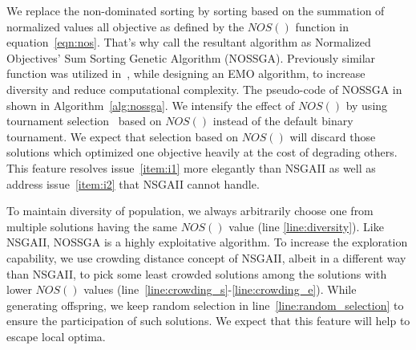 We replace the non-dominated sorting by sorting based on the summation of normalized values all objective as defined by the $NOS()$ function in equation~\ref{eqn:nos}. That's why call the resultant algorithm as Normalized Objectives' Sum Sorting Genetic Algorithm (NOSSGA). Previously similar function was utilized in~\cite{qu2010multi}, while designing an EMO algorithm, to increase diversity and reduce computational complexity. The pseudo-code of NOSSGA in shown in Algorithm~\ref{alg:nossga}. We intensify the effect of $NOS()$ by using tournament selection~\cite{goldberg1991comparative} based on $NOS()$ instead of the default binary tournament. We expect that selection based on $NOS()$ will discard those solutions which optimized one objective heavily at the cost of degrading others. This feature resolves issue~\ref{item:i1} more elegantly than NSGAII as well as address issue~\ref{item:i2} that NSGAII cannot handle. 

To maintain diversity of population, we always arbitrarily choose one from multiple solutions having the same $NOS()$ value (line \ref{line:diversity}). Like NSGAII, NOSSGA is a highly exploitative algorithm. To increase the exploration capability, we use crowding distance concept of NSGAII, albeit in a different way than NSGAII, to pick some least crowded solutions among the solutions with lower $NOS()$ values  (line~\ref{line:crowding_s}-\ref{line:crowding_e}). While generating offspring, we keep random selection in line~\ref{line:random_selection} to ensure the participation of such solutions. We expect that this feature will help to escape local optima.



